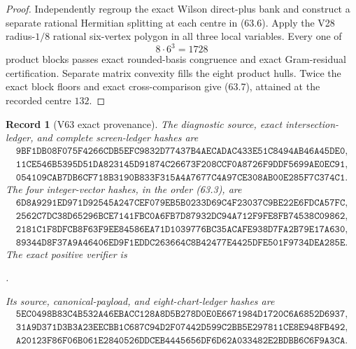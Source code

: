 \documentclass[11pt,oneside]{article}
\newtheorem{record}[theorem]{Record}
\theoremstyle{definition}
\theoremstyle{remark}
\begin{document}
\begin{proof}
Independently regroup the exact Wilson direct-plus bank and
construct a separate rational Hermitian splitting at each centre
in (63.6).  Apply the V28 radius-\(1/8\) rational six-vertex polygon
in all three local variables.  Every one of
\[
 8\cdot6^3=1728                                       \tag{63.8}
\]
product blocks passes exact rounded-basis congruence and exact
Gram-residual certification.  Separate matrix convexity fills the
eight product hulls.  Twice the exact block floors and exact
cross-comparison give (63.7), attained at the recorded centre
\(132\).
\end{proof}

\begin{record}[V63 exact provenance]
\label{rec:newv63-provenance}
The diagnostic source, exact intersection-ledger, and complete
screen-ledger hashes are
\[
\begin{gathered}
\texttt{9BF1DB08F075F4266CDB5EFC9832D77437B4AECADAC433E51C8494AB46A45DE0},\\
\texttt{11CE546B5395D51DA823145D91874C26673F208CCF0A8726F9DDF5699AE0EC91},\\
\texttt{054109CAB7DB6CF718B3190B833F315A4A7677C4A97CE308AB00E285F7C374C1}.
\end{gathered}                                        \tag{63.9}
\]
The four integer-vector hashes, in the order (63.3), are
\[
\begin{gathered}
\texttt{6D8A9291ED971D92545A247CEF079EB5B0233D69C4F23037C9BE22E6FDCA57FC},\\
\texttt{2562C7DC38D65296BCE7141FBC0A6FB7D87932DC94A712F9FE8FB74538C09862},\\
\texttt{2181C1F8DFCB8F63F9EE84586EA71D1039776BC35ACAFE938D7FA2B79E17A630},\\
\texttt{89344D8F37A9A46406ED9F1EDDC263664C8B42477E4425DFE501F9734DEA285E}.
\end{gathered}                                        \tag{63.10}
\]
The exact positive verifier is
\begin{center}
\footnotesize
{}.
\end{center}
Its source, canonical-payload, and eight-chart-ledger hashes are
\[
\begin{gathered}
\texttt{5EC0498B83C4B532A46EBACC128A8D5B278D0E0E6671984D1720C6A6852D6937},\\
\texttt{31A9D371D3B3A23EECBB1C687C94D2F07442D599C2BB5E297811CE8E948FB492},\\
\texttt{A20123F86F06B061E2840526DDCEB4445656DF6D62A033482E2BDBB6C6F9A3CA}.
\end{gathered}                                        \tag{63.11}
\]
\end{record}
\end{document}
